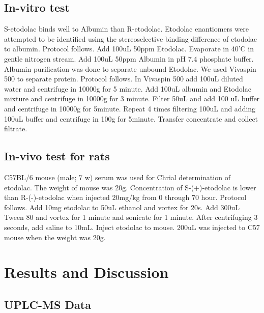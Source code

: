 \documentclass[12pt]{article} %
\begin{document}
\subsection {In-vitro test}
 S-etodolac binds well to Albumin than R-etodolac.\cite{cite4} Etodolac enantiomers were attempted to be identified using the stereoselective binding difference of etodolac to albumin.
 Protocol follows.  Add 100uL 50ppm Etodolac. Evaporate in 40'C in gentle nitrogen stream. Add 100uL 50ppm Albumin in pH 7.4 phosphate buffer.
 Albumin purification was done to separate unbound Etodolac. We used Vivaspin 500 to separate protein.
 Protocol follows. In Vivaspin 500 add 100uL diluted water and centrifuge in 10000g for 5 minute. Add 100uL albumin and Etodolac mixture and centrifuge in 10000g for 3 minute. Filter 50uL and add 100 uL buffer and centrifuge in 10000g for 5minute. Repeat 4 times filtering 100uL and adding 100uL buffer and centrifuge in 100g for 5minute. Transfer concentrate and collect filtrate.


\subsection {In-vivo test for rats}
 C57BL/6 mouse (male; 7 w) serum was used for Chrial determination of \linebreak etodolac. The weight of mouse was 20g. Concentration of S-(+)-etodolac is lower than R-(-)-etodolac when injected 20mg/kg from 0 through 70 hour.\cite{cite2}
  Protocol follows. Add 10mg etodolac to 50uL ethanol and vortex for 20s. Add 300uL Tween 80 and vortex for 1 minute and sonicate for 1 minute. After centrifuging 3 seconds, add saline to 10mL. Inject etodolac to mouse.
  200uL was injected to C57 mouse when the weight was 20g.


  

\newpage

\section {Results and Discussion}

\subsection {UPLC-MS Data}
\end{document}
